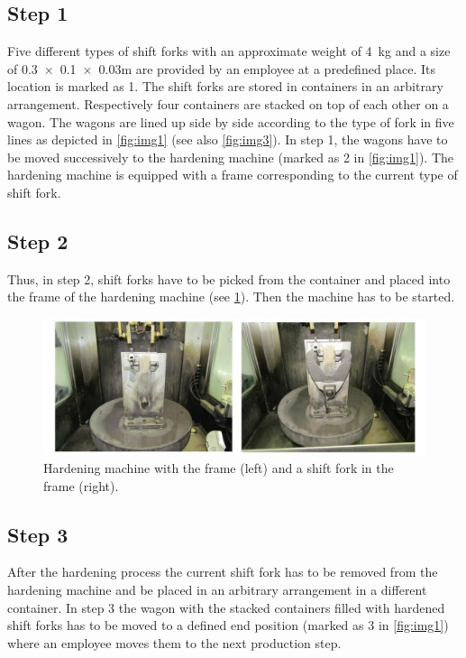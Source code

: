 \documentclass[11pt,english]{AMdocument}
\begin{document}
		\subsection*{Step 1}

Five different types of shift forks with an approximate weight of \SI{4}{kg} and a size of \num{0.3 x 0.1 x 0.03}\si{m} are provided by an employee at a predefined place. Its location is marked as 1. The shift forks are stored in containers in an arbitrary arrangement. Respectively four containers are stacked on top of each other on a wagon. The wagons are lined up side by side according to the type of fork in five lines as depicted in \cref{fig:img1} (see also \cref{fig:img3}). In step 1, the wagons have to be moved successively to the hardening machine (marked as 2 in \cref{fig:img1}). The hardening machine is equipped with a frame corresponding to the current type of shift fork. 

		\subsection*{Step 2}

Thus, in step 2, shift forks have to be picked from the container and placed into the frame of the hardening machine (see \cref{fig:img2}). Then the machine has to be started.

\begin{figure}[h]
	\centering
	\includegraphics[width=\textwidth]{img002}
	\caption{Hardening machine with the frame (left) and a shift fork in the frame (right).}
	\label{fig:img2}
\end{figure}

		\subsection*{Step 3}

After the hardening process the current shift fork has to be removed from the hardening machine and be placed in an arbitrary arrangement in a different container. In step 3 the wagon with the stacked containers filled with hardened shift forks has to be moved to a defined end position (marked as 3 in \cref{fig:img1}) where an employee moves them to the next production step.
\end{document}
